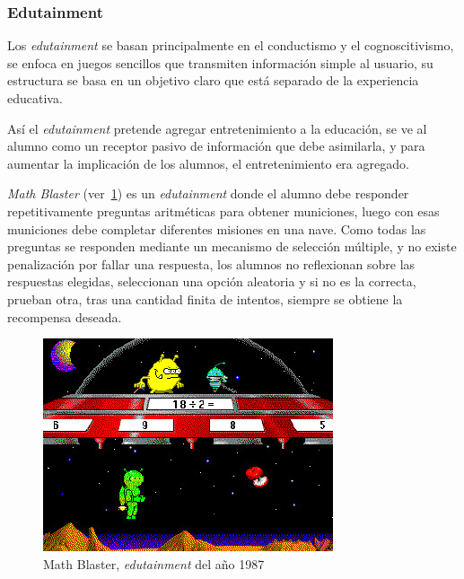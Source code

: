 \subsubsection{Edutainment}
\label{sec:edutainment}


Los \emph{edutainment} se basan principalmente en el conductismo y el
cognoscitivismo, se enfoca en juegos sencillos que transmiten información simple
al usuario, su estructura se basa en un objetivo claro que está separado de la
experiencia educativa\cite{egenfeldt2007third}. 

Así el \emph{edutainment} pretende agregar entretenimiento a la educación, se
ve al alumno como un receptor pasivo de información que debe asimilarla, y para
aumentar la implicación de los alumnos, el entretenimiento era
agregado\cite{resnick:2004}.


\emph{Math Blaster} (ver~\ref{fig:math_blaster}) es un \emph{edutainment} donde
el alumno debe responder repetitivamente preguntas aritméticas para obtener
municiones, luego con esas municiones debe completar diferentes misiones en una
nave\cite{bruckman1999can}. Como todas las preguntas se responden mediante un
mecanismo de selección múltiple, y no existe penalización por fallar una
respuesta, los alumnos no reflexionan sobre las respuestas elegidas, seleccionan
una opción aleatoria y si no es la correcta, prueban otra, tras una cantidad
finita de intentos, siempre se obtiene la recompensa deseada.

\begin{figure}[ht!] 
\centering 
\includegraphics[scale=0.5,natwidth=296,natheight=217]{tics/images/math_blaster.jpg}
\caption{Math Blaster, \emph{edutainment} del año 1987}
\label{fig:math_blaster} 
\end{figure}

